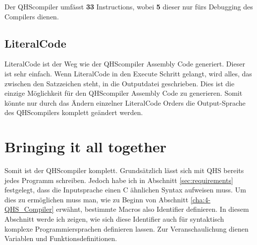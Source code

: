 Der QHScompiler umfässt \textbf{33} Instructions, wobei \textbf{5} dieser nur fürs Debugging des Compilers dienen.

\subsection{LiteralCode}
LiteralCode ist der Weg wie der QHScompiler Assembly Code generiert. Dieser ist sehr einfach. Wenn LiteralCode in den Execute Schritt gelangt, wird alles, das zwischen den Satzzeichen steht, in die Outputdatei geschrieben.
Dies ist die einzige Möglichkeit für den QHScompiler Assembly Code zu generieren. Somit könnte nur durch das Ändern einzelner LiteralCode Orders die Output-Sprache des QHScompilers komplett geändert werden.


\section{Bringing it all together} \label{sec:qhs-bringing-it-together}
Somit ist der QHScompiler komplett. Grundsätzlich lässt sich mit QHS bereits jedes Programm schreiben. 
Jedoch habe ich in Abschnitt \ref{sec:requirements} festgelegt, dass die Inputsprache einen C ähnlichen Syntax aufweisen muss.
Um dies zu ermöglichen muss man, wie zu Beginn von Abschnitt \ref{cha:4-QHS_Compiler} erwähnt, bestimmte Macros also Identifier definieren.
In diesem Abschnitt werde ich zeigen, wie sich diese Identifier auch für syntaktisch komplexe Programmiersprachen definieren lassen.
Zur Veranschaulichung dienen Variablen und Funktionsdefinitionen.

